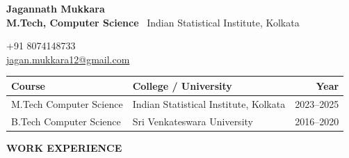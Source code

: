 \documentclass[10pt,article]{article}
\newcommand{\resheading}[1]{%
 \vspace{7pt}%
 \noindent\colorbox{mygrey}{\parbox{\dimexpr\textwidth-2\fboxsep\relax}{\textbf{\small #1}}}%
 \vspace{4pt}%
}
\begin{document}
\noindent
\begin{minipage}[b]{0.68\textwidth}
   {\Large \textbf{Jagannath Mukkara}}\\[2pt]
   \textbf{M.Tech, Computer Science} \textbar\ Indian Statistical Institute, Kolkata
\end{minipage}%
\hfill
\begin{minipage}[b]{0.32\textwidth}
   \raggedleft \small
   +91 8074148733 \\
   \href{mailto:jagan.mukkara12@gmail.com}{jagan.mukkara12@gmail.com}
\end{minipage}
\vspace{6pt}
\noindent
\begin{tabularx}{\textwidth}{@{} l X r @{}}
\toprule
\textbf{Course} & \textbf{College / University} & \textbf{Year} \\
\midrule
M.Tech Computer Science & Indian Statistical Institute, Kolkata & 2023--2025 \\
B.Tech Computer Science & Sri Venkateswara University & 2016--2020 \\
\bottomrule
\end{tabularx}
\resheading{WORK EXPERIENCE}
\end{document}
